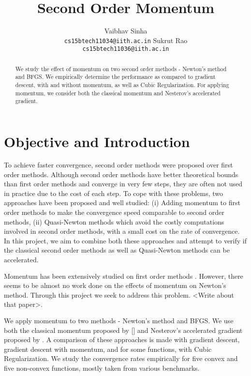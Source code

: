 \documentclass{article}
\title{Second Order Momentum}
\author{
  Vaibhav Sinha \\
  \texttt{cs15btech11034@iith.ac.in}
  \And
  Sukrut Rao \\
  \texttt{cs15btech11036@iith.ac.in}
}
\begin{document}
\maketitle

\begin{abstract}
  We study the effect of momentum on two second order methods - Newton's method and BFGS. We empirically determine the performance as compared to gradient descent, with and without momentum, as well as Cubic Regularization. For applying momentum, we consider both the classical momentum and Nesterov's accelerated gradient.
\end{abstract}

\section{Objective and Introduction}\label{introduction}

To achieve faster convergence, second order methods were proposed over first order methods. Although second order methods have better theoretical bounds than first order methods and converge in very few steps, they are often not used in practice due to the cost of each step. To cope with these problems, two approaches have been proposed and well studied: (i) Adding momentum \cite{POLYAK19641,Sutskever} to first order methods to make the convergence speed comparable to second order methods, (ii) Quasi-Newton methods \citep{davidon,broyden1965class,nocedal1980updating} which avoid the costly computations involved in second order methods, with a small cost on the rate of convergence. In this project, we aim to combine both these approaches and attempt to verify if the classical second order methods as well as Quasi-Newton methods can be accelerated.

Momentum has been extensively studied on first order methods \citep{POLYAK19641,Sutskever}. However, there seems to be almost no work done on the effects of momentum on Newton’s method. Through this project we seek to address this problem. <Write about that paper>.

We apply momentum to two methods - Newton's method and BFGS. We use both the classical momentum proposed by [] and Nesterov's accelerated gradient proposed by \citet{Sutskever}. A comparison of these approaches is made with gradient descent, gradient descent with momentum, and for some functions, with Cubic Regularization. We study the convergence rates empirically for five convex and five non-convex functions, mostly taken from various benchmarks.
\end{document}

